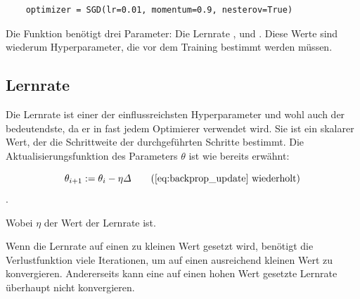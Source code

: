 \begin{lstlisting}
    optimizer = SGD(lr=0.01, momentum=0.9, nesterov=True)
\end{lstlisting}

Die Funktion  benötigt drei Parameter: Die Lernrate ,  und .
Diese Werte sind wiederum Hyperparameter, die vor dem Training bestimmt werden müssen.

\subsection{Lernrate}

Die Lernrate ist einer der einflussreichsten Hyperparameter und wohl auch der bedeutendste, da er in fast jedem Optimierer verwendet wird.
Sie ist ein skalarer Wert, der die Schrittweite der durchgeführten Schritte bestimmt. Die Aktualisierungsfunktion des Parameters $\theta$ ist wie bereits erwähnt:

\begin{equation}
    \theta_{i+1} := \theta_i - \eta \varDelta \tag{\ref{eq:backprop_update}     wiederholt}
\end{equation}.

Wobei $\eta$ der Wert der Lernrate ist.

Wenn die Lernrate auf einen zu kleinen Wert gesetzt wird, benötigt die Verlustfunktion viele Iterationen, um auf einen ausreichend kleinen Wert zu konvergieren.
Andererseits kann eine auf einen hohen Wert gesetzte Lernrate überhaupt nicht konvergieren.

